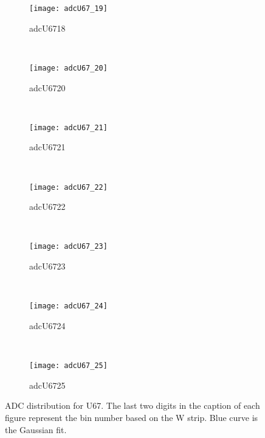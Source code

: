 \begin{figure}[h]
\begin{subfigure}[h]{0.3\textwidth}
        \centering
        \texttt{[image: adcU67\_19]}
        \caption{adcU6718}
        \label{fig:adcU67_18}
    \end{subfigure}
    \\
    \begin{subfigure}[h]{0.3\textwidth}
        \centering
        \texttt{[image: adcU67\_20]}
        \caption{adcU6720}
        \label{fig:adcU67_20}
    \end{subfigure}
    ~
    \begin{subfigure}[h]{0.3\textwidth}
        \centering
        \texttt{[image: adcU67\_21]}
        \caption{adcU6721}
        \label{fig:adcU67_21}
    \end{subfigure}
    ~
    \begin{subfigure}[h]{0.3\textwidth}
        \centering
        \texttt{[image: adcU67\_22]}
        \caption{adcU6722}
        \label{fig:adcU67_22}
    \end{subfigure}
    \\
    \begin{subfigure}[h]{0.3\textwidth}
        \centering
        \texttt{[image: adcU67\_23]}
        \caption{adcU6723}
        \label{fig:adcU67_23}
    \end{subfigure}
    ~
    \begin{subfigure}[h]{0.3\textwidth}
        \centering
        \texttt{[image: adcU67\_24]}
        \caption{adcU6724}
        \label{fig:adcU67_24}
    \end{subfigure}
    ~
    \begin{subfigure}[h]{0.3\textwidth}
        \centering
        \texttt{[image: adcU67\_25]}
        \caption{adcU6725}
        \label{fig:adcU67_25}
    \end{subfigure}
    \caption{ADC distribution for U67. The last two digits in the caption of each figure represent the bin number based on the W strip.
    Blue curve is the Gaussian fit.}
    \label{fig:adcU2}
\end{figure}


